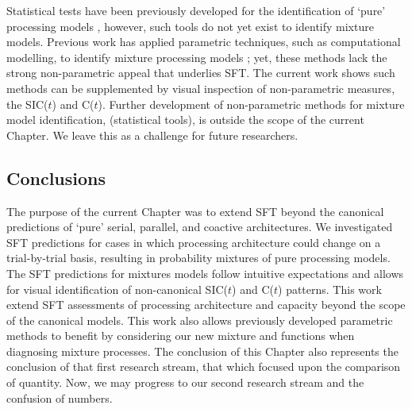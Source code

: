 Statistical tests have been previously developed for the identification of `pure' processing models \cite{houpt2010statSIC, houpt2012statCap, houpt2017hierarchical, houpt2017bayesSIC, Houpt2016, Thiele2017}, however, such tools do not yet exist to identify mixture models. Previous work has applied parametric techniques, such as computational modelling, to identify mixture processing models \cite{Little2011, Moneer2016, Cheng2018}; yet, these methods lack the strong non-parametric appeal that underlies SFT. The current work shows such methods can be supplemented by visual inspection of non-parametric measures, the SIC($t$) and C($t$). Further development of non-parametric methods for mixture model identification, (\ie statistical tools), is outside the scope of the current Chapter. We leave this as a challenge for future researchers.

\subsection{Conclusions}
The purpose of the current Chapter was to extend SFT beyond the canonical predictions of `pure' serial, parallel, and coactive architectures. We investigated SFT predictions for cases in which processing architecture could change on a trial-by-trial basis, resulting in probability mixtures of pure processing models. The SFT predictions for mixtures models follow intuitive expectations and allows for visual identification of non-canonical SIC($t$) and C($t$) patterns. This work extend SFT assessments of processing architecture and capacity beyond the scope of the canonical models. This work also allows previously developed parametric methods to benefit by considering our new mixture \SIC and \Ct functions when diagnosing mixture processes. The conclusion of this Chapter also represents the conclusion of that first research stream, that which focused upon the comparison of quantity. Now, we may progress to our second research stream and the confusion of numbers.
\color{black}


